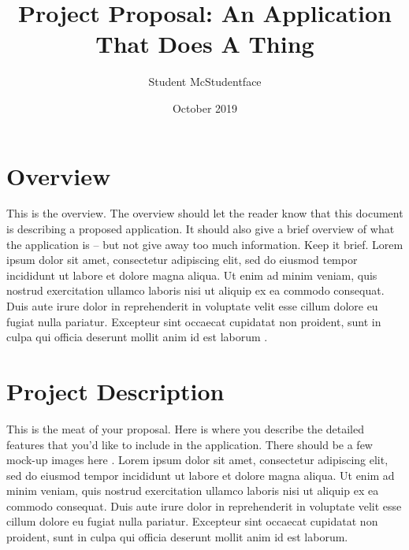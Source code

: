 \documentclass[12pt]{extarticle}
\title{Project Proposal: An Application That Does A Thing}
\author{Student McStudentface}
\date{October 2019}
\begin{document}
\maketitle

\section{Overview} \small
This is the overview. The overview should let the reader know that 
this document is describing a proposed application. It should also give
a brief overview of what the application is -- but not give away too much
information. Keep it brief. Lorem ipsum dolor sit amet, consectetur adipiscing elit, sed do eiusmod tempor incididunt ut labore et dolore magna aliqua. Ut enim ad minim veniam, quis nostrud exercitation ullamco laboris nisi ut aliquip ex ea commodo consequat. Duis aute irure dolor in reprehenderit in voluptate velit esse cillum dolore eu fugiat nulla pariatur. Excepteur sint occaecat cupidatat non proident, sunt in culpa qui officia deserunt mollit anim id est laborum \cite{fractalwiki}.

\section{Project Description} \small
This is the meat of your proposal. Here is where you describe the detailed 
features that you'd like to include in the application. There should be a few
mock-up images here \cite{vihart}. Lorem ipsum dolor sit amet, consectetur adipiscing elit, sed do eiusmod tempor incididunt ut labore et dolore magna aliqua. Ut enim ad minim veniam, quis nostrud exercitation ullamco laboris nisi ut aliquip ex ea commodo consequat. Duis aute irure dolor in reprehenderit in voluptate velit esse cillum dolore eu fugiat nulla pariatur. Excepteur sint occaecat cupidatat non proident, sunt in culpa qui officia deserunt mollit anim id est laborum.
\end{document}
